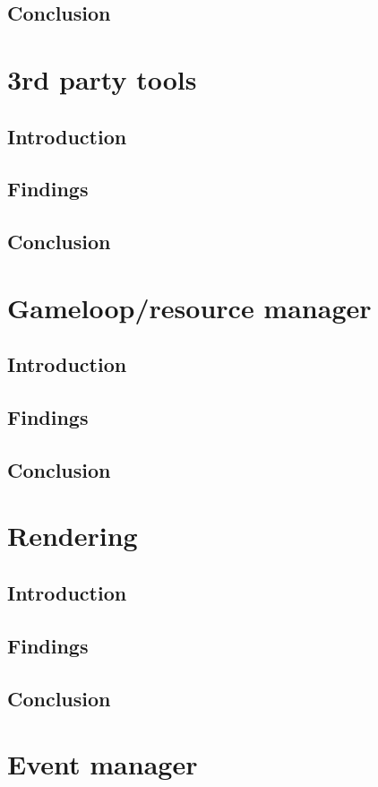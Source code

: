\documentclass{projdoc}
\begin{document}
    \subsection{Conclusion}

\section{3rd party tools}
    \subsection{Introduction}
    \subsection{Findings}
    \subsection{Conclusion}
\section{Gameloop/resource manager}
    \subsection{Introduction}
    \subsection{Findings}
    \subsection{Conclusion}
\section{Rendering}
    \subsection{Introduction}
    \subsection{Findings}
    \subsection{Conclusion}
\section{Event manager}
\end{document}
